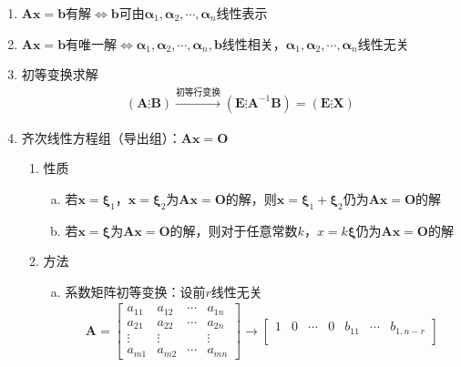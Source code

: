 \documentclass[12pt]{book}
\begin{document}
\begin{enumerate}[1.]
    \item $\bm{Ax}=\bm{b}$有解$\Leftrightarrow \bm{b}$可由$\bm{\alpha}_1,\bm{\alpha}_2,\cdots,\bm{\alpha}_n$线性表示
    \item $\bm{Ax}=\bm{b}$有唯一解$\Leftrightarrow\bm{\alpha}_1,\bm{\alpha}_2,\cdots,\bm{\alpha}_n, \bm{b}$线性相关，$\bm{\alpha}_1,\bm{\alpha}_2,\cdots,\bm{\alpha}_n$线性无关
    \item 初等变换求解
          \begin{gather*}
              (\bm{A}\vdots \bm{B})\xrightarrow{初等行变换}(\bm{E}\vdots\bm{A}^{-1}\bm{B})=(\bm{E}\vdots\bm{X})
          \end{gather*}
    \item 齐次线性方程组（导出组）：$\bm{Ax}=\bm{O}$
          \begin{enumerate}[(1)]
              \item 性质
                    \begin{enumerate}[a.]
                        \item 若$\bm{x}=\bm{\xi}_1$，$\bm{x}=\bm{\xi}_2$为$\bm{Ax}=\bm{O}$的解，则$\bm{x}=\bm{\xi}_1+\bm{\xi}_2$仍为$\bm{Ax}=\bm{O}$的解
                        \item 若$\bm{x}=\bm{\xi}$为$\bm{A x}=\bm{O}$的解，则对于任意常数$k$，$x=k\bm{\xi}$仍为$\bm{Ax}=\bm{O}$的解
                    \end{enumerate}
              \item 方法
                    \begin{enumerate}[a.]
                        \item 系数矩阵初等变换：设前$r$线性无关
                              \begin{gather*}
                                  \bm{A}=
                                  \begin{bmatrix}
                                      a_{11} & a_{12} & \cdots & a_{1n} \\
                                      a_{21} & a_{22} & \cdots & a_{2n} \\
                                      \vdots & \vdots &        & \vdots \\
                                      a_{m1} & a_{m2} & \cdots & a_{mn}
                                  \end{bmatrix}\rightarrow\begin{bmatrix}
                                      1      & 0      & \cdots & 0      & b_{11} & \cdots & b_{1,n-r} \\

\end{bmatrix}
\end{gather*}
\end{enumerate}
\end{enumerate}
\end{enumerate}
\end{document}
